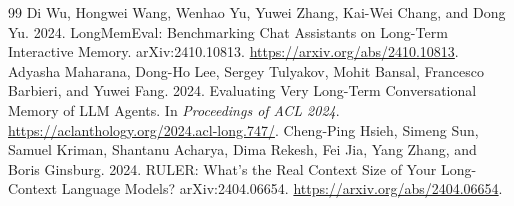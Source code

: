 \documentclass[11pt,a4paper]{article}
\begin{document}
\begin{thebibliography}{99}
 Di Wu, Hongwei Wang, Wenhao Yu, Yuwei Zhang, Kai-Wei Chang, and Dong Yu. 2024. LongMemEval: Benchmarking Chat Assistants on Long-Term Interactive Memory. \mbox{\textnormal{arXiv:2410.10813}}. \url{https://arxiv.org/abs/2410.10813}.
 Adyasha Maharana, Dong-Ho Lee, Sergey Tulyakov, Mohit Bansal, Francesco Barbieri, and Yuwei Fang. 2024. Evaluating Very Long-Term Conversational Memory of LLM Agents. In \emph{Proceedings of ACL 2024}. \url{https://aclanthology.org/2024.acl-long.747/}.
 Cheng-Ping Hsieh, Simeng Sun, Samuel Kriman, Shantanu Acharya, Dima Rekesh, Fei Jia, Yang Zhang, and Boris Ginsburg. 2024. RULER: What's the Real Context Size of Your Long-Context Language Models? \mbox{\textnormal{arXiv:2404.06654}}. \url{https://arxiv.org/abs/2404.06654}.
\end{thebibliography}
\end{document}
